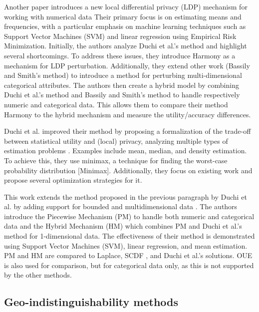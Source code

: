 Another paper introduces a new local differential privacy (LDP) mechanism for working with numerical data \citep{nguyen_collecting_2016}
Their primary focus is on estimating means and frequencies, with a particular emphasis on machine learning techniques such as Support Vector Machines (SVM) and linear regression using Empirical Risk Minimization.
Initially, the authors analyze Duchi et al.'s method \citep{duchi_privacy_2013} and highlight several shortcomings.
To address these issues, they introduce Harmony as a mechanism for LDP perturbation. Additionally, they extend other work (Bassily and Smith's method) to introduce a method for perturbing multi-dimensional categorical attributes.
The authors then create a hybrid model by combining Duchi et al.'s method and Bassily and Smith's method to handle respectively numeric and categorical data. This allows them to compare their method Harmony to the hybrid mechanism and measure the utility/accuracy differences.

Duchi et al. improved their method by proposing a formalization of the trade-off between statistical utility and (local) privacy, analyzing multiple types of estimation problems \citep{duchi_minimax_2017}.
Examples include mean, median, and density estimation.
To achieve this, they use minimax, a technique for finding the worst-case probability distribution [Minimax].
Additionally, they focus on existing work and propose several optimization strategies for it.

This work extends the method proposed in the previous paragraph by Duchi et al. by adding support for bounded and multidimensional data \citep{wang_collecting_2019}.
The authors introduce the Piecewise Mechanism (PM) to handle both numeric and categorical data and the Hybrid Mechanism (HM) which combines PM and Duchi et al.'s method for 1-dimensional data.
The effectiveness of their method is demonstrated using Support Vector Machines (SVM), linear regression, and mean estimation.
PM and HM are compared to Laplace, SCDF , and Duchi et al.'s solutions.
OUE  is also used for comparison, but for categorical data only, as this is not supported by the other methods.


\subsection{Geo-indistinguishability methods}
